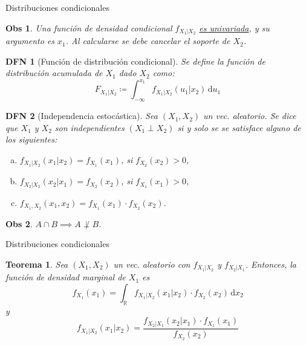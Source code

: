 \documentclass[a4paper]{article}
\newtheorem{definition}{DFN}
\theoremstyle{mytheoremstyle}
\newtheorem{theorem}{Teorema}
\newtheorem*{obs}{Obs}
\newcommand{\R}{\mathbb{R}}
\newcommand{\1}{\mathds{1}}
\newcommand{\diff}[1]{\,\mathrm{d}#1}
\begin{document}
\begin{multicols*}{3}
\begin{roundbox}{Distribuciones condicionales}
\begin{obs}
Una función de densidad condicional $f_{X_1 | X_2}$ \underline{es univariada}, y su argumento es $x_1$.
Al calcularse se debe cancelar el soporte de $X_2$.
\end{obs}

\begin{definition}[Función de distribución condicional]
    Se define la función de distribución acumulada de $X_1$ dado $X_2$ como: 
    \begin{equation*}
        F_{X_1 | X_2} \coloneqq \int_{-\infty}^{x_1} f_{X_1 | X_2} (u_1 | x_2) \diff{u_1}
    \end{equation*}
\end{definition}

\begin{definition}[Independencia estocástica]
    Sea $(X_1, X_2)$ un vec. aleatorio.
    Se dice que $X_1$ y $X_2$ son independientes $(X_1 \perp X_2)$ si y solo se se satisface alguno de los siguientes:
    \begin{enumerate}[a)]
        \item $f_{X_1 | X_2} (x_1 | x_2) = f_{X_1} (x_1)$, \quad si $f_{X_2}(x_2) > 0$,
        \item $f_{X_2 | X_2} (x_2 | x_1) = f_{X_2} (x_2)$, \quad si $f_{X_1}(x_1) > 0$,
        \item $f_{X_1, X_2} (x_1, x_2) = f_{X_1} (x_1) \cdot f_{X_2} (x_2)$.
    \end{enumerate}
\end{definition}

\begin{obs}
$A \cap B \implies A \not\perp B$.
\end{obs}
\end{roundbox}

\begin{roundbox}{Distribuciones condicionales}
\begin{theorem}
    Sea $(X_1, X_2)$ un vec. aleatorio con $f_{X_1 | X_2}$ y $f_{X_2 | X_1}$.
    Entonces, la función de densidad marginal de $X_1$ es
    \begin{equation*}
        f_{X_1}(x_1) = \int_{\R} f_{X_1 | X_2} (x_1 | x_2) \cdot f_{X_2} (x_2) \diff{x_2} \tag{$\triangle$}
    \end{equation*}
    y
    \begin{equation*}
        f_{X_1 | X_{2}} (x_1 | x_2) = \frac{f_{X_2 | X_1}(x_2 | x_1) \cdot f_{X_1}(x_1) }{f_{X_2}(x_2)} \tag{$\square$}
    \end{equation*}
\end{theorem}


\end{roundbox}
\end{multicols*}
\end{document}
